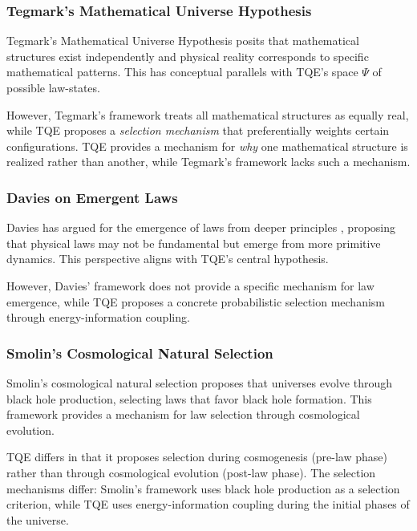 \documentclass[12pt,a4paper]{article}
\theoremstyle{definition}
\theoremstyle{remark}
\begin{document}
\subsubsection{Tegmark's Mathematical Universe Hypothesis}

Tegmark's Mathematical Universe Hypothesis \cite{tegmark2014mathematical} posits that mathematical structures exist independently and physical reality corresponds to specific mathematical patterns. This has conceptual parallels with TQE's space $\Psi$ of possible law-states.

However, Tegmark's framework treats all mathematical structures as equally real, while TQE proposes a \emph{selection mechanism} that preferentially weights certain configurations. TQE provides a mechanism for \emph{why} one mathematical structure is realized rather than another, while Tegmark's framework lacks such a mechanism.

\subsubsection{Davies on Emergent Laws}

Davies has argued for the emergence of laws from deeper principles \cite{davies2007goldilocks}, proposing that physical laws may not be fundamental but emerge from more primitive dynamics. This perspective aligns with TQE's central hypothesis.

However, Davies' framework does not provide a specific mechanism for law emergence, while TQE proposes a concrete probabilistic selection mechanism through energy-information coupling.

\subsubsection{Smolin's Cosmological Natural Selection}

Smolin's cosmological natural selection \cite{smolin1997life} proposes that universes evolve through black hole production, selecting laws that favor black hole formation. This framework provides a mechanism for law selection through cosmological evolution.

TQE differs in that it proposes selection during cosmogenesis (pre-law phase) rather than through cosmological evolution (post-law phase). The selection mechanisms differ: Smolin's framework uses black hole production as a selection criterion, while TQE uses energy-information coupling during the initial phases of the universe.
\end{document}
